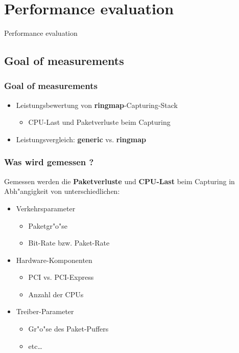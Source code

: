 \documentclass{beamer}
\begin{document}
\section{Performance evaluation}
\begin{frame}
	\begin{center}
	\huge{Performance evaluation}
	\end{center}
\end{frame}

\subsection*{Goal of measurements}

\begin{frame}
\frametitle{Goal of measurements}
\begin{itemize}
	\item Leistungsbewertung von \textbf{ringmap}-Capturing-Stack
		\begin{itemize}
			\item CPU-Last und Paketverluste beim Capturing\newline
		\end{itemize}
	\item Leistungsvergleich: \textbf{generic} vs. \textbf{ringmap}
\end{itemize}
\end{frame}

\begin{frame}
\frametitle{Was wird gemessen ?}
Gemessen werden  die \textbf{Paketverluste} und \textbf{CPU-Last} beim
Capturing in Abh"angigkeit von unterschiedlichen:\newline
\begin{itemize}
	\item Verkehrsparameter
		\begin{itemize}
			\item Paketgr"o"se
			\item Bit-Rate bzw. Paket-Rate
		\end{itemize}

\color{gray}
	\item  Hardware-Komponenten
		\begin{itemize}
\color{gray}
			\item PCI vs. PCI-Express
			\item Anzahl der CPUs
		\end{itemize}
	\item Treiber-Parameter
		\begin{itemize}
\color{gray}
			\item Gr"o"se des Paket-Puffers
			\item etc\ldots
		\end{itemize}
\end{itemize}
\normalcolor
\end{frame}
\end{document}
